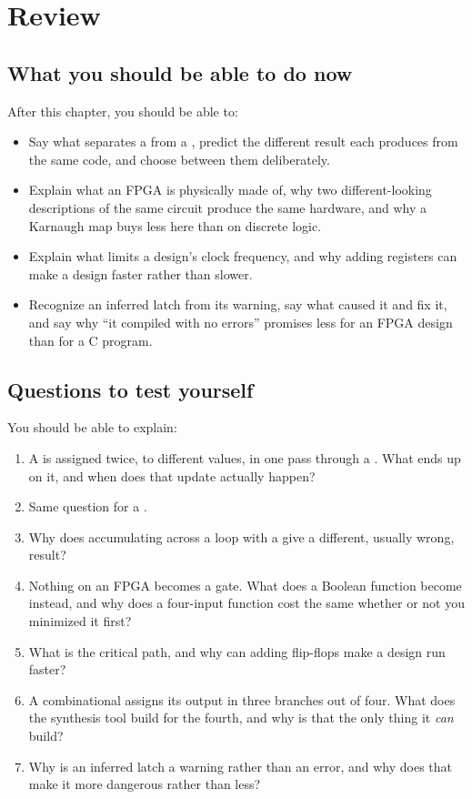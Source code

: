 
\section{Review}
\label{c5:sec:review}

\subsection*{What you should be able to do now}
After this chapter, you should be able to:
\begin{itemize}
  \item Say what separates a  from a , predict the different result each
    produces from the same code, and choose between them deliberately.
  \item Explain what an FPGA is physically made of, why two different-looking descriptions of the
    same circuit produce the same hardware, and why a Karnaugh map buys less here than on discrete
    logic.
  \item Explain what limits a design's clock frequency, and why adding registers can make a design
    faster rather than slower.
  \item Recognize an inferred latch from its warning, say what caused it and fix it, and say why
    ``it compiled with no errors'' promises less for an FPGA design than for a C program.
\end{itemize}

\subsection*{Questions to test yourself}
You should be able to explain:
\begin{enumerate}
  \item A  is assigned twice, to different values, in one pass through a
    . What ends up on it, and when does that update actually happen?
  \item Same question for a .
  \item Why does accumulating across a loop with a  give a different, usually wrong,
    result?
  \item Nothing on an FPGA becomes a gate. What does a Boolean function become instead, and why does
    a four-input function cost the same whether or not you minimized it first?
  \item What is the critical path, and why can adding flip-flops make a design run faster?
  \item A combinational  assigns its output in three branches out of four. What does the
    synthesis tool build for the fourth, and why is that the only thing it \emph{can} build?
  \item Why is an inferred latch a warning rather than an error, and why does that make it more
    dangerous rather than less?
\end{enumerate}

